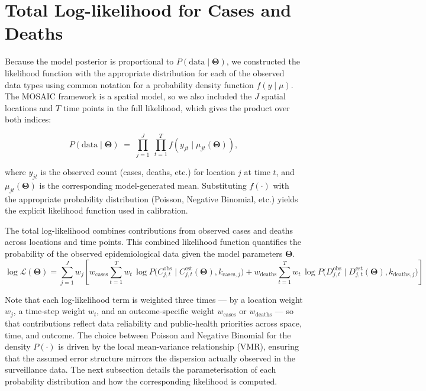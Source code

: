 \documentclass[
]{book}
\begin{document}
\section{Total Log-likelihood for Cases and Deaths}\label{total-log-likelihood-for-cases-and-deaths}

Because the model posterior is proportional to \(P(\text{data}\mid\boldsymbol{\Theta})\), we constructed the likelihood function with
the appropriate distribution for each of the observed data types using common notation for a probability density function \(f(y\mid\mu)\). The MOSAIC framework is a spatial model, so we also included the \(J\) spatial locations and \(T\) time points in the full
likelihood, which gives the product over both indices:

\begin{equation}
P\left(\text{data}\mid\boldsymbol{\Theta}\right)
\;=\;
\prod_{j=1}^{J}
\;\prod_{t=1}^{T}
f\!\left(
y_{jt}\;
\bigl|\;
\mu_{jt}\!\left(\boldsymbol{\Theta}\right)
\right),
\label{eq:total-log-likelihood-1}
\end{equation}

where \(y_{jt}\) is the observed count (cases, deaths, etc.) for location \(j\) at
time \(t\), and \(\mu_{jt}(\boldsymbol{\Theta})\) is the corresponding model-generated
mean. Substituting \(f(\cdot)\) with the appropriate probability distribution
(Poisson, Negative Binomial, etc.) yields the explicit likelihood function used in
calibration.

The total log-likelihood combines contributions from observed cases and deaths across locations and time points. This combined likelihood function quantifies the probability of the observed epidemiological data given the model parameters \(\boldsymbol{\Theta}\).
\begin{equation}
\log \mathcal{L}(\boldsymbol{\Theta}) =
\sum_{j=1}^{J} w_{j} \left[
w_{\text{cases}} \sum_{t=1}^{T} w_{t}\,\log P\bigl(C_{j,t}^{\text{obs}} \mid C_{j,t}^{\text{est}}(\boldsymbol{\Theta}), k_{\text{cases},j}\bigr)
+ w_{\text{deaths}} \sum_{t=1}^{T} w_{t}\,\log P\bigl(D_{j,t}^{\text{obs}} \mid D_{j,t}^{\text{est}}(\boldsymbol{\Theta}), k_{\text{deaths},j}\bigr)
\right]
\label{eq:total-log-likelihood-2}
\end{equation}

Note that each log-likelihood term is weighted three times --- by a location weight \(w_j\), a time-step weight \(w_t\), and an outcome-specific weight \(w_{\text{cases}}\) or \(w_{\text{deaths}}\) --- so that contributions reflect data reliability and public-health priorities across space, time, and outcome. The choice between Poisson and Negative Binomial for the density \(P(\cdot)\) is driven by the local mean-variance relationship (VMR), ensuring that the assumed error structure mirrors the dispersion actually observed in the surveillance data. The next subsection details the parameterisation of each probability distribution and how the corresponding likelihood is computed.
\end{document}

